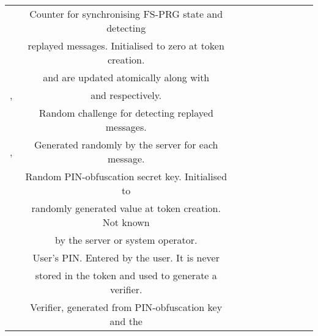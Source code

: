 \begin{table}[!h]
\begin{scriptsize}
{{\begin{tabular}{|c|c|c|c|c|c|c|c|c|c|}
    \cellcolor{white!20}\scriptsize &\cellcolor{white!20}\scriptsize   Counter for synchronising FS-PRG state and detecting\\ 
                     
    \cellcolor{white!20}\scriptsize &\cellcolor{white!20}\scriptsize   replayed messages.  Initialised to zero at token creation.\\ 

\cellcolor{white!20}\scriptsize &\cellcolor{white!20}\scriptsize  \VC{\counter} and \VS{\counter} are updated atomically along with\\ 

\multirow{-4}{*}{\cellcolor{white!20}\scriptsize  \VC{\counter}, \VS{\counter}  }&\cellcolor{white!20}\scriptsize  \VC{\state} and \VS{\state} respectively.\\   



\cellcolor{gray!20}\scriptsize &\cellcolor{gray!20}\scriptsize   Random challenge for detecting replayed messages.\\ 

\multirow{-2}{*}{\cellcolor{gray!20}\scriptsize   \VS{\nonce}, \VM{\nonce}  }&\cellcolor{gray!20}\scriptsize  Generated randomly by the server for each message.\\   



\cellcolor{white!20}\scriptsize &\cellcolor{white!20}\scriptsize   Random PIN-obfuscation secret key. Initialised to\\ 


\cellcolor{white!20}\scriptsize &\cellcolor{white!20}\scriptsize   randomly generated value at token creation. Not known \\ 


\multirow{-3}{*}{\cellcolor{white!20}\scriptsize  \VC{\salt}}&\cellcolor{white!20}\scriptsize  by  the server or system operator.\\   



\cellcolor{gray!20}\scriptsize &\cellcolor{gray!20}\scriptsize   User's PIN.  Entered by the user. It is never \\ 


\multirow{-2}{*}{\cellcolor{gray!20}\scriptsize  \VC{\pin}}&\cellcolor{gray!20}\scriptsize  stored in the token and used to generate a verifier.\\   

      
  \cellcolor{white!20}\scriptsize &\cellcolor{white!20}\scriptsize   Verifier, generated from PIN-obfuscation key and the\\ 



\end{tabular}}}
\end{scriptsize}
\end{table}
